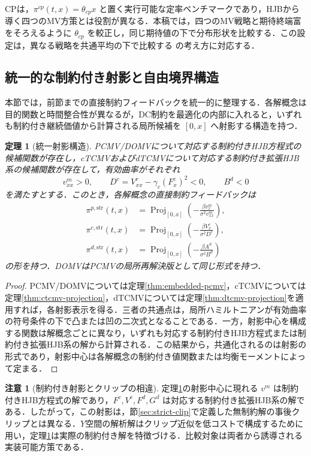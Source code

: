 \documentclass[10pt,a4paper]{article}
\theoremstyle{plain}
\newtheorem{theorem}{定理}
\theoremstyle{definition}
\newtheorem{remark}{注意}
\DeclareMathOperator{\Proj}{Proj}
\begin{document}
CPは，$\pi^{cp}(t,x)=\theta_{cp}x$ と置く実行可能な定率ベンチマークであり，HJBから導く四つのMV方策とは役割が異なる．本稿では，四つのMV戦略と期待終端富をそろえるように $\theta_{cp}$ を較正し，同じ期待値の下で分布形状を比較する．この設定は，異なる戦略を共通平均の下で比較する \citet{vanStadenDangForsyth2021} の考え方に対応する．

\subsection{統一的な制約付き射影と自由境界構造}
\label{sec:unified}

本節では，前節までの直接制約フィードバックを統一的に整理する．各解概念は目的関数と時間整合性が異なるが，DC制約を最適化の内部に入れると，いずれも制約付き継続価値から計算される局所候補を $[0,x]$ へ射影する構造を持つ．

\begin{theorem}[統一射影構造]
\label{thm:unified}
PCMV/DOMVについて対応する制約付きHJB方程式の候補関数が存在し，cTCMVおよびdTCMVについて対応する制約付き拡張HJB系の候補関数が存在して，有効曲率がそれぞれ
\[
  v_{xx}^m>0,
  \qquad
  D^c=V_{xx}^c-\gamma_c(F_x^c)^2<0,
  \qquad
  B^d<0
\]
を満たすとする．このとき，各解概念の直接制約フィードバックは
\begin{align*}
  \pi^{p,\mathrm{str}}(t,x)&=\Proj_{[0,x]}
  \left(-\frac{\beta v_x^m}{\sigma^2v_{xx}^m}\right),\\
  \pi^{c,\mathrm{str}}(t,x)&=\Proj_{[0,x]}
  \left(-\frac{\beta V_x^c}{\sigma^2D^c}\right),\\
  \pi^{d,\mathrm{str}}(t,x)&=\Proj_{[0,x]}
  \left(-\frac{\beta A^d}{\sigma^2B^d}\right)
\end{align*}
の形を持つ．DOMVはPCMVの局所再解決版として同じ形式を持つ．
\end{theorem}

\begin{proof}
PCMV/DOMVについては定理\ref{thm:embedded-pcmv}，cTCMVについては定理\ref{thm:ctcmv-projection}，dTCMVについては定理\ref{thm:dtcmv-projection}を適用すれば，各射影表示を得る．三者の共通点は，局所ハミルトニアンが有効曲率の符号条件の下で凸または凹の二次式となることである．一方，射影中心を構成する関数は解概念ごとに異なり，いずれも対応する制約付きHJB方程式または制約付き拡張HJB系の解から計算される．この結果から，共通化されるのは射影の形式であり，射影中心は各解概念の制約付き値関数または均衡モーメントによって定まる．
\end{proof}

\begin{remark}[制約付き射影とクリップの相違]
定理\ref{thm:unified}の射影中心に現れる $v^m$ は制約付きHJB方程式の解であり，$F^c,V^c,F^d,G^d$ は対応する制約付き拡張HJB系の解である．したがって，この射影は，節\ref{sec:strict-clip}で定義した無制約解の事後クリップとは異なる．$Y$空間の解析解はクリップ近似を低コストで構成するために用い，定理\ref{thm:unified}は実際の制約付き解を特徴づける．比較対象は両者から誘導される実装可能方策である．
\end{remark}
\end{document}
